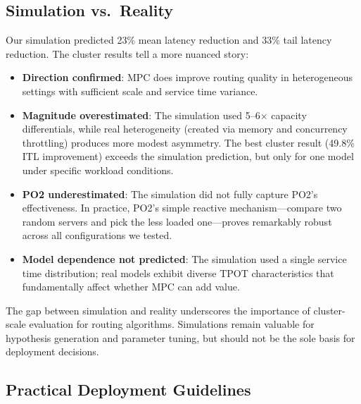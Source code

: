 \documentclass[runningheads]{llncs}
\begin{document}
\subsection{Simulation vs.\ Reality}

Our simulation predicted 23\% mean latency reduction and 33\% tail latency reduction. The cluster results tell a more nuanced story:

\begin{itemize}
    \item \textbf{Direction confirmed}: MPC does improve routing quality in heterogeneous settings with sufficient scale and service time variance.
    \item \textbf{Magnitude overestimated}: The simulation used 5--6$\times$ capacity differentials, while real heterogeneity (created via memory and concurrency throttling) produces more modest asymmetry. The best cluster result (49.8\% ITL improvement) exceeds the simulation prediction, but only for one model under specific workload conditions.
    \item \textbf{PO2 underestimated}: The simulation did not fully capture PO2's effectiveness. In practice, PO2's simple reactive mechanism---compare two random servers and pick the less loaded one---proves remarkably robust across all configurations we tested.
    \item \textbf{Model dependence not predicted}: The simulation used a single service time distribution; real models exhibit diverse TPOT characteristics that fundamentally affect whether MPC can add value.
\end{itemize}

The gap between simulation and reality underscores the importance of cluster-scale evaluation for routing algorithms. Simulations remain valuable for hypothesis generation and parameter tuning, but should not be the sole basis for deployment decisions.

\subsection{Practical Deployment Guidelines}
\end{document}
